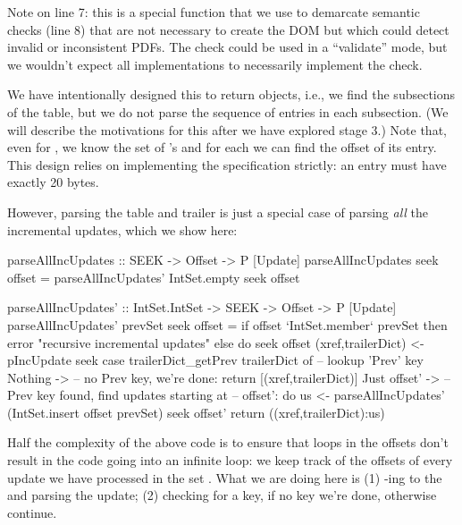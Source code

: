 Note  on line 7: this is a special function that we
use to demarcate semantic checks (line 8) that are not necessary to
create the DOM but which could detect invalid or inconsistent PDFs.
%
The check could be used in a ``validate'' mode, but we wouldn't expect
all implementations to necessarily implement the check.

We have intentionally designed this to return  objects,
i.e., we find the subsections of the \xref{} table, but we do not
parse the sequence of \xref{} entries in each subsection.
(We will describe the motivations for this after
we have explored stage 3.)
%
Note that, even for ,
we know the set of \objid{}'s and for each we can find the offset
of its \xref{} entry.  This design relies on implementing
the specification strictly: an \xref{} entry must have exactly 20 bytes.

However, parsing the \xref{} table and trailer is just a special case
of parsing \emph{all} the incremental updates, which we show here:
\lstset{numbers=right}
\begin{code}
parseAllIncUpdates :: SEEK -> Offset -> P [Update]
parseAllIncUpdates seek offset =
  parseAllIncUpdates' IntSet.empty seek offset

parseAllIncUpdates' :: IntSet.IntSet -> SEEK -> Offset -> P [Update]
parseAllIncUpdates' prevSet seek offset =
    if offset `IntSet.member` prevSet then
      error "recursive incremental updates"
    else
      do
      seek offset
      (xref,trailerDict) <- pIncUpdate seek
      case trailerDict_getPrev trailerDict of   -- lookup 'Prev' key
        Nothing      -> -- no Prev key, we're done:
                        return [(xref,trailerDict)]
        Just offset' -> -- Prev key found, find updates starting at
                        -- offset':
                        do
                        us <- parseAllIncUpdates'
                                (IntSet.insert offset prevSet)
                                seek
                                offset'
                        return ((xref,trailerDict):us)
\end{code}
\lstset{numbers=none}

Half the complexity of the above code is to ensure that loops in
the  offsets don't result in the code going
into an infinite loop: we keep track of the offsets of every update
we have processed in the set .
What we are doing here is
(1) -ing to the  and parsing the update;
(2) checking for a  key, if no key we're done, otherwise
    continue.

